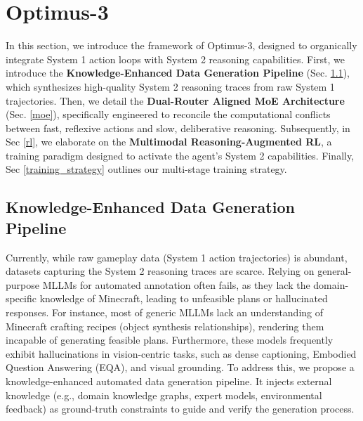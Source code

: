 



\section{Optimus-3}
In this section, we introduce the framework of Optimus-3, designed to organically integrate System 1 action loops with System 2 reasoning capabilities. First, we introduce the \textbf{Knowledge-Enhanced Data Generation Pipeline} (Sec. \ref{pipeline}), which synthesizes high-quality System 2 reasoning traces from raw System 1 trajectories. Then, we detail the \textbf{Dual-Router Aligned MoE Architecture} (Sec. \ref{moe}), specifically engineered to reconcile the computational conflicts between fast, reflexive actions and slow, deliberative reasoning. Subsequently, in Sec \ref{rl}, we elaborate on the \textbf{Multimodal Reasoning-Augmented RL}, a training paradigm designed to activate the agent's System 2 capabilities. Finally, Sec \ref{training_strategy} outlines our multi-stage training strategy.



\subsection{Knowledge-Enhanced Data Generation Pipeline}
\label{pipeline}

Currently, while raw gameplay data (System 1 action trajectories) is abundant, datasets capturing the System 2 reasoning traces are scarce. Relying on general-purpose MLLMs for automated annotation often fails, as they lack the domain-specific knowledge of Minecraft, leading to unfeasible plans or hallucinated responses. For instance, most of generic MLLMs \cite{gpt4,lu2024deepseek,dong2024internlm,team2024gemini} lack an understanding of Minecraft crafting recipes (object synthesis relationships), rendering them incapable of generating feasible plans. Furthermore, these models frequently exhibit hallucinations \cite{bai2024hallucination} in vision-centric tasks, such as dense captioning, Embodied Question Answering (EQA), and visual grounding. To address this, we propose a knowledge-enhanced automated data generation pipeline. It injects external knowledge (e.g., domain knowledge graphs, expert models, environmental feedback) as ground-truth constraints to guide and verify the generation process.


